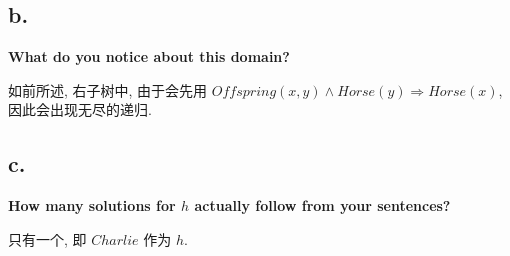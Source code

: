 \documentclass[UTF8]{article}
\newcommand{\jumpLine} {\hspace*{\fill} \par}
\begin{document}
\subsection*{b.}
\noindent \textbf{What do you notice about this domain?}\\\jumpLine\noindent
如前所述, 右子树中, 由于会先用 $Offspring(x,y)\land Horse(y)\Rightarrow Horse(x)$, 因此会出现无尽的递归.
\subsection*{c.}
\noindent \textbf{How many solutions for $h$ actually follow from your sentences? }\\\jumpLine\noindent
只有一个, 即 $Charlie$ 作为 $h$.
\end{document}

